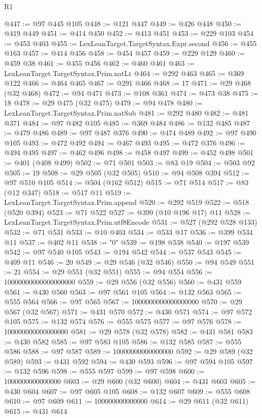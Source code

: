 \begin{lexlean}{R1}
\begin{coremodule}
{{{{{{{{{{{{{{{{{{{{{{{{{{{{{{{{{{{{{{{{{{{{{{{{{{{{{{{{{{{{{{{{{{{{{{{{{{{{{{{{{{{{{{{{{{{{{{{{{{{{{{{{{{{{{{{{{{{{{{{{{{{{{{{{{{{{{{{{{{{{{{{{{{{{{{{{{{{{{{{{{{{{{{{{{{{{{{{{{{{{{{{{{{@447 := @97 @445 @105
@448 := @121 @447
@449 := @426 @448
@450 := @419 @449
@451 := @414 @450
@452 := @413 @451
@453 := @229 @103
@454 := @453 @403
@455 := LexLeanTarget.TargetSyntax.Expr.second
@456 := @455 @163
@457 := @414 @456
@458 := @454 @457
@459 := @229 @129
@460 := @459 @38
@461 := @455 @456
@462 := @460 @461
@463 := LexLeanTarget.TargetSyntax.Prim.natLt
@464 := @292 @463
@465 := @369 @122
@466 := @464 @465
@467 := @291 @466
@468 := 17
@471 := @29 @468 (@32 @468)
@472 := @94 @471
@473 := @108 @361
@474 := @473 @38
@475 := 18
@478 := @29 @475 (@32 @475)
@479 := @94 @478
@480 := LexLeanTarget.TargetSyntax.Prim.natSub
@481 := @292 @480
@482 := @481 @371
@484 := @97 @482 @105
@485 := @369 @484
@486 := @132 @485
@487 := @479 @486
@489 := @97 @487 @376
@490 := @474 @489
@492 := @97 @490 @105
@493 := @472 @492
@494 := @467 @493
@495 := @472 @376
@496 := @494 @495
@497 := @462 @496
@498 := @458 @497
@499 := @452 @498
@501 := @401 (@408 @499)
@502 := @71 @501
@503 := @83 @19
@504 := @503 @92
@505 := 19
@508 := @29 @505 (@32 @505)
@510 := @94 @508 @394
@512 := @97 @510 @105
@514 := @504 (@162 @512)
@515 := @71 @514
@517 := @83 (@12 @347)
@518 := @517 @11
@519 := LexLeanTarget.TargetSyntax.Prim.append
@520 := @292 @519
@522 := @518 (@520 @394)
@523 := @71 @522
@527 := @399 (@10 @196 @17) @11
@528 := LexLeanTarget.TargetSyntax.Prim.utf8Encode
@531 := @527 (@292 @528 @133)
@532 := @71 @531
@533 := @10 @403
@534 := @533 @17
@536 := @399 @534 @11
@537 := @402 @11
@538 := "0"
@539 := @198 @538
@540 := @197 @539
@542 := @97 @540 @105
@543 := @194 @542
@544 := @537 @543
@545 := @409 @11
@546 := 20
@549 := @29 @546 (@32 @546)
@550 := @94 @549
@551 := 21
@554 := @29 @551 (@32 @551)
@555 := @94 @554
@556 := 10000000000000000000
@559 := @29 @556 (@32 @556)
@560 := @431 @559
@561 := @430 @560
@563 := @97 @561 @105
@564 := @132 @563
@565 := @555 @564
@566 := @97 @565
@567 := 1000000000000000000
@570 := @29 @567 (@32 @567)
@571 := @431 @570
@572 := @430 @571
@574 := @97 @572 @105
@575 := @132 @574
@576 := @555 @575
@577 := @97 @576
@578 := 100000000000000000
@581 := @29 @578 (@32 @578)
@582 := @431 @581
@583 := @430 @582
@585 := @97 @583 @105
@586 := @132 @585
@587 := @555 @586
@588 := @97 @587
@589 := 10000000000000000
@592 := @29 @589 (@32 @589)
@593 := @431 @592
@594 := @430 @593
@596 := @97 @594 @105
@597 := @132 @596
@598 := @555 @597
@599 := @97 @598
@600 := 1000000000000000
@603 := @29 @600 (@32 @600)
@604 := @431 @603
@605 := @430 @604
@607 := @97 @605 @105
@608 := @132 @607
@609 := @555 @608
@610 := @97 @609
@611 := 100000000000000
@614 := @29 @611 (@32 @611)
@615 := @431 @614
}}}}}}}}}}}}}}}}}}}}}}}}}}}}}}}}}}}}}}}}}}}}}}}}}}}}}}}}}}}}}}}}}}}}}}}}}}}}}}}}}}}}}}}}}}}}}}}}}}}}}}}}}}}}}}}}}}}}}}}}}}}}}}}}}}}}}}}}}}}}}}}}}}}}}}}}}}}}}}}}}}}}}}}}}}}}}}}}}}}}}}}}}}
\end{coremodule}
\end{lexlean}
